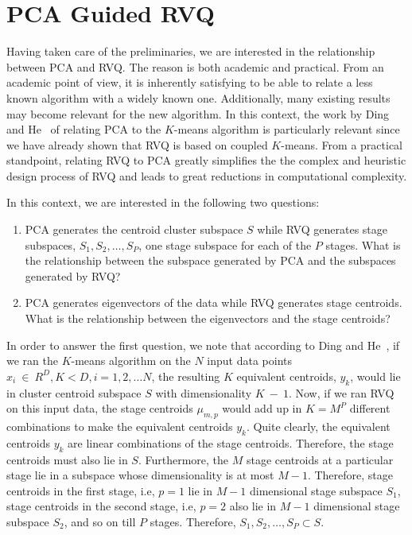 \documentclass{article}
\begin{document}
\section{PCA Guided RVQ}
Having taken care of the preliminaries, we are interested in the relationship between PCA and RVQ.  The reason is both academic and practical.  From an academic point of view, it is inherently satisfying to be able to relate a less known algorithm with a widely known one.  Additionally, many existing results may become relevant for the new algorithm.  In this context, the work by Ding and He~\cite{2004_CNF_KmeansVsPCA_DingHe} of relating PCA to the $K$-means algorithm is particularly relevant since we have already shown that RVQ is based on coupled $K$-means.  From a practical standpoint, relating RVQ to PCA greatly simplifies the the complex and heuristic design process of RVQ and leads to great reductions in computational complexity.

In this context, we are interested in the following two questions:
\begin{enumerate}
\item PCA generates the centroid cluster subspace $S$ while RVQ generates stage subspaces, $S_1, S_2, \hdots, S_P$, one stage subspace for each of the $P$ stages.  What is the relationship between the subspace generated by PCA and the subspaces generated by RVQ?
\item PCA generates eigenvectors of the data while RVQ generates stage centroids.  What is the relationship between the eigenvectors and the stage centroids?
\end{enumerate}
In order to answer the first question, we note that according to Ding and He~\cite{2004_CNF_KmeansVsPCA_DingHe}, if we ran the $K$-means algorithm on the $N$ input data points $x_i~\in~R^D, K<D, i=1, 2, \hdots N$, the resulting $K$ equivalent centroids, $y_k$, would lie in cluster centroid subspace $S$ with dimensionality $K~-~1$.  Now, if we ran RVQ on this input data, the stage centroids $\mu_{m,p}$ would add up in $K=M^P$ different combinations to make the equivalent centroids $y_k$.  Quite clearly, the equivalent centroids $y_k$ are linear combinations of the stage centroids.  Therefore, the stage centroids must also lie in $S$.  Furthermore, the $M$ stage centroids at a particular stage lie in a subspace whose dimensionality is at most $M-1$.  Therefore, stage centroids in the first stage, i.e, $p=1$ lie in $M-1$ dimensional stage subspace $S_1$, stage centroids in the second stage, i.e, $p=2$ also lie in $M-1$ dimensional stage subspace $S_2$, and so on till $P$ stages.  Therefore, $S_1, S_2, \hdots, S_P \subset S$.
\end{document}
